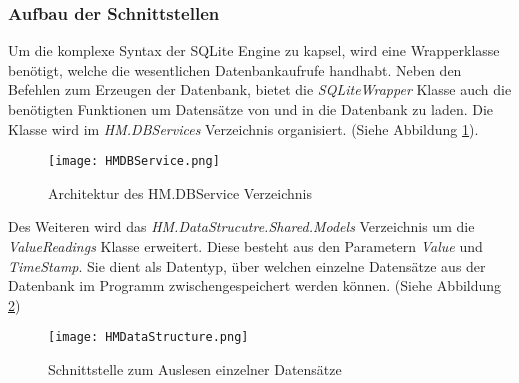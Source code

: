 \subsubsection*{Aufbau der Schnittstellen}
Um die komplexe Syntax der SQLite Engine zu kapsel, wird eine Wrapperklasse benötigt, welche die wesentlichen Datenbankaufrufe handhabt. Neben den Befehlen zum Erzeugen der Datenbank, bietet die \textit{SQLiteWrapper} Klasse auch die benötigten Funktionen um Datensätze von und in die Datenbank zu laden. Die Klasse wird im \textit{HM.DBServices} Verzeichnis organisiert. (Siehe Abbildung \ref{fig:HMDBServi}).
\vspace{-0.3cm}
\begin{center}
    \begin{figure}[h!]
        \centering
        \texttt{[image: HMDBService.png]}
        \caption{Architektur des HM.DBService Verzeichnis}
        \label{fig:HMDBServi}
    \end{figure}
\end{center}
\vspace{-1.8cm}
Des Weiteren wird das \textit{HM.DataStrucutre.Shared.Models} Verzeichnis um die \textit{ValueReadings} Klasse erweitert. Diese besteht aus den Parametern \textit{Value} und \textit{TimeStamp}. Sie dient als Datentyp, über welchen einzelne Datensätze aus der Datenbank im Programm zwischengespeichert werden können. (Siehe Abbildung \ref{fig:ValueReadingsKlasse})
\begin{center}
    \begin{figure}[h!]
        \centering
        \texttt{[image: HMDataStructure.png]}
        \caption{Schnittstelle zum Auslesen einzelner Datensätze}
        \label{fig:ValueReadingsKlasse}
    \end{figure}
\end{center}





















